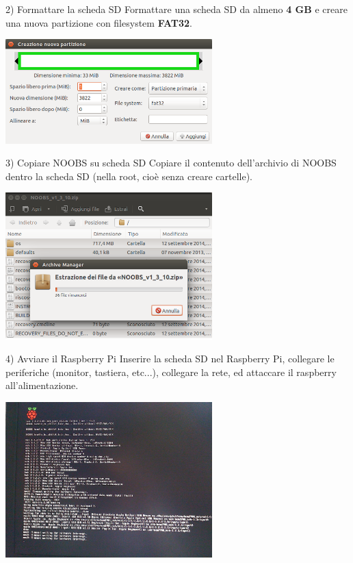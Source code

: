 \documentclass[xcolor=svgnames,11pt]{beamer}
\begin{document}
\begin{frame}{2) Formattare la scheda SD}
Formattare una scheda SD da almeno \textbf{4 GB} e creare una nuova partizione con filesystem \textbf{FAT32}.

\bigskip
\begin{center}
\includegraphics[width=8cm]{guide/2.png}
\end{center}
\end{frame}

\begin{frame}{3) Copiare NOOBS su scheda SD}
Copiare il contenuto dell'archivio di NOOBS dentro la scheda SD (nella root, cio\`e senza creare cartelle).

\medskip
\begin{center}
\includegraphics[width=8cm]{guide/3.png}
\end{center}
\end{frame}

\begin{frame}{4) Avviare il Raspberry Pi}
Inserire la scheda SD nel Raspberry Pi, collegare le periferiche (monitor, tastiera, etc...), collegare la rete, ed attaccare il raspberry all'alimentazione.

\medskip
\begin{center}
\includegraphics[width=8cm]{guide/4.jpg}
\end{center}
\end{frame}
\end{document}
